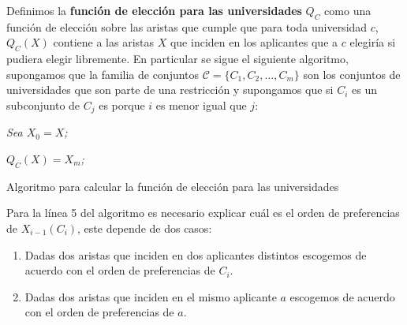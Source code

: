 \begin{dfn}
Definimos la \textbf{función de elección para las universidades} $Q_C$ como una función de elección sobre las aristas que cumple que para toda universidad $c$, $Q_C(X)$ contiene a las aristas $X$ que inciden en los aplicantes que a $c$ elegiría si pudiera elegir libremente. En particular se sigue el siguiente algoritmo, supongamos que la familia de conjuntos $\mathcal{C}=\{C_1,C_2,\dots,C_m\}$ son los conjuntos de universidades que son parte de una restricción y supongamos que si $C_i$ es un subconjunto de $C_j$ es porque $i$ es menor igual que $j$:

\IncMargin{1em}
\begin{Algoritmo}[H]

\BlankLine
\emph{Sea $X_0 = X$;}


\emph{$Q_C(X) = X_m$;}
\caption{Algoritmo para calcular la función de elección para las universidades}
\end{Algoritmo}
\DecMargin{1em}

Para la línea 5 del algoritmo es necesario explicar cuál es el orden de preferencias de $X_{i-1}(C_i)$, este depende de dos casos: 
\begin{enumerate}
\item Dadas dos aristas que inciden en dos aplicantes distintos escogemos de acuerdo con el orden de preferencias de $C_i$.
\item Dadas dos aristas que inciden en el mismo aplicante $a$ escogemos de acuerdo con el orden de preferencias de $a$.
\end{enumerate}

\end{dfn}

